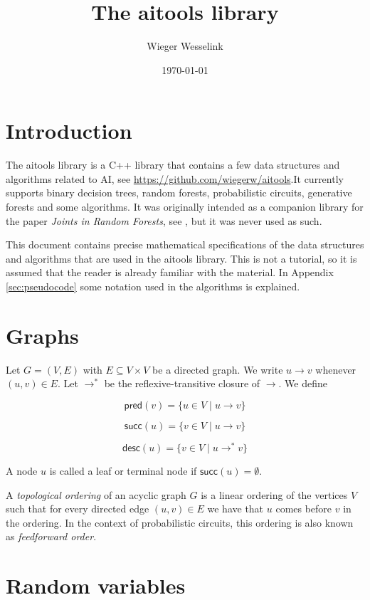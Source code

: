 \documentclass{article}
\title{The aitools library}
\author{Wieger Wesselink}
\date{\today}
\newcommand{\func}[1]{\ensuremath{\textsf{#1}}} %
\begin{document}
\maketitle

\section{Introduction}
The aitools library is a C++ library that contains a few data structures and algorithms
related to AI, see \href{https://github.com/wiegerw/aitools}{https://github.com/wiegerw/aitools}.It currently supports binary decision trees, random forests, 
probabilistic circuits, generative forests and some algorithms.
It was originally intended as a companion library for the paper \textit{Joints in Random Forests}, see \cite{correia2020joints}, but it was never used as such.

\vspace{0.5cm}
\noindent
This document contains precise mathematical specifications of the data structures and algorithms that are used in the aitools library. This is not a tutorial, so it is assumed that the reader is already familiar with the material. In Appendix \ref{sec:pseudocode} some notation used in the algorithms is explained. 

\section{Graphs}
Let $G = (V, E)$ with $E \subseteq V \times V$ be a directed graph. We write $u \rightarrow v$ whenever $(u,v) \in E$. Let $\rightarrow^*$ be the reflexive-transitive closure of $\rightarrow$. We define

\[
\func{pred}(v) = \{ u \in V \mid u \rightarrow v \}
\]

\[
\func{succ}(u) = \{ v \in V \mid u \rightarrow v \}
\]

\[
\func{desc}(u) = \{ v \in V \mid u \rightarrow^* v \}
\]

\noindent
A node $u$ is called a leaf or terminal node if $\func{succ}(u) = \emptyset$.

\vspace{0.5cm}
\noindent
A \emph{topological ordering} of an acyclic graph $G$ is a linear ordering of the vertices $V$ such that for every directed edge $(u,v) \in E$ we have that $u$ comes before $v$ in the ordering. In the context of probabilistic circuits, this ordering is also known as \emph{feedforward order}.

\section{Random variables}
\end{document}
